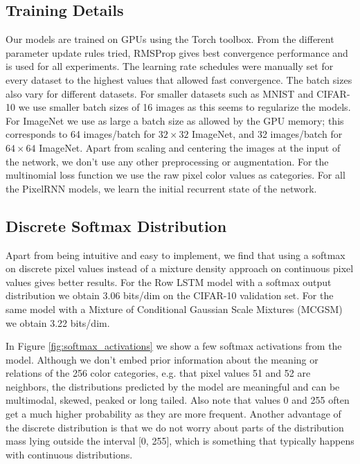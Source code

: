 \documentclass{article}
\begin{document}
\subsection{Training Details}
\label{sect:training_details}

Our models are trained on GPUs using the Torch toolbox. From the different parameter update rules tried, RMSProp gives best convergence performance and is used for all experiments. The learning rate schedules were manually set for every dataset to the highest values that allowed fast convergence. The batch sizes also vary for different datasets. For smaller datasets such as MNIST and CIFAR-10 we use smaller batch sizes of 16 images as this seems to regularize the models. For ImageNet we use as large a batch size as allowed by the GPU memory; this corresponds to 64 images/batch for $32\times32$ ImageNet, and 32 images/batch for $64\times64$ ImageNet. Apart from scaling and centering the images at the input of the network, we don't use any other preprocessing or augmentation. For the multinomial loss function we use the raw pixel color values as categories. For all the PixelRNN models, we learn the initial recurrent state of the network.

\subsection{Discrete Softmax Distribution}
Apart from being intuitive and easy to implement, we find that using a softmax on discrete pixel values instead of a mixture density approach on continuous pixel values gives better results. For the Row LSTM model with a softmax output distribution we obtain 3.06 bits/dim on the CIFAR-10 validation set. For the same model with a Mixture of Conditional Gaussian Scale Mixtures (MCGSM) \cite{theis2015generative} we obtain 3.22 bits/dim. 

In Figure \ref{fig:softmax_activations} we show a few softmax activations from the model. Although we don't embed prior information about the meaning or relations of the 256 color categories, e.g. that pixel values 51 and 52 are neighbors, the distributions predicted by the model are meaningful and can be multimodal, skewed, peaked or long tailed. Also note that values 0 and 255 often get a much higher probability as they are more frequent. Another advantage of the discrete distribution is that we do not worry about parts of the distribution mass lying outside the interval [0, 255], which is something that typically happens with continuous distributions.
\end{document}
